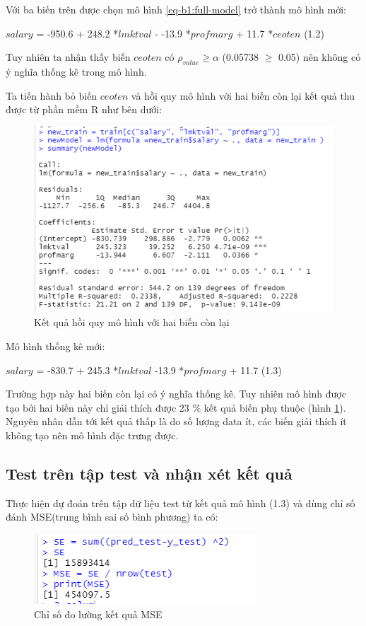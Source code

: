 Với ba biến trên được chọn mô hình \ref{eq-b1:full-model} trở thành mô hình mới:

$\textit{salary}$ = -950.6 + 248.2 *$\textit{lmktval}$ - -13.9 *$\textit{profmarg}$ + 11.7  *$\textit{ceoten}$  (1.2)

Tuy nhiên ta nhận thấy biến $\textit{ceoten}$ có $\rho_{value} \ge \alpha$ (0.05738 $\ge$ 0.05) nên không có ý nghĩa thống kê trong mô hình.

Ta tiến hành bỏ biến $\textit{ceoten}$ và hồi quy mô hình với hai biến còn lại kết quả thu được từ phần mềm R như bên dưới:

\begin{figure}[h!]
	\centering
	\includegraphics[scale = 0.52]{../Photo Of Result/B1_newsummary.PNG}  
	\caption{Kết quả hồi quy mô hình với hai biến còn lại}
	\label{fig-b1:new-summary}
\end{figure}

Mô hình thống kê mới:

$\textit{salary}$ = -830.7 + 245.3 *$\textit{lmktval}$ -13.9 *$\textit{profmarg}$ + 11.7  (1.3)


Trường hợp này hai biến còn lại có ý nghĩa thống kê. Tuy nhiên mô hình được tạo bởi hai biến này chỉ giải thích được 23 $\%$ kết quả biến phụ thuộc (hình \ref{fig-b1:new-summary}). Nguyên nhân dẫn tới kết quả thấp là do số lượng data ít, các biến giải thích ít không tạo nên mô hình đặc trưng được.



\subsection*{Test trên tập test và nhận xét kết quả}

Thực hiện dự đoán trên tập dữ liệu test từ kết quả mô hình (1.3)  và dùng chỉ số đánh MSE(trung bình sai số bình phương) ta có:

\begin{figure}[h!]
	\centering
	\includegraphics[scale = 0.5]{../Photo Of Result/B1_MSE.PNG}  
	\caption{Chỉ số đo lường kết quả MSE}
	\label{fig-b1:mse}
\end{figure}










